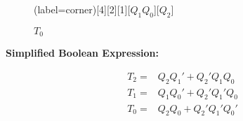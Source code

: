 \documentclass[a4paper,12pt]{article}
\begin{document}
\begin{figure}[H]
	\begin{minipage}{0.5\linewidth}
		\centering
		\begin{karnaugh-map}(label=corner)[4][2][1][$Q_1Q_0$][$Q_2$]
		\end{karnaugh-map}
		\caption*{$T_0$}
	\end{minipage}
\end{figure}

\textbf{Simplified Boolean Expression:}

\begin{align*}
	T_2 =& Q_2Q_1' + Q_2'Q_1Q_0 \\
	T_1 =& Q_1Q_0' + Q_2'Q_1'Q_0 \\
	T_0 =& Q_2Q_0 + Q_2'Q_1'Q_0'
\end{align*}
\end{document}
